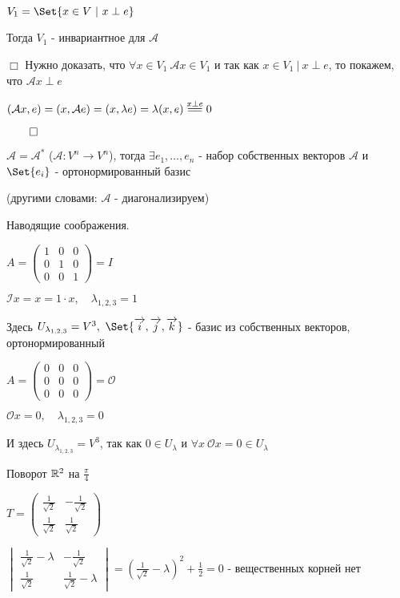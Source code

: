\documentclass[12pt]{article}
\begin{document}
    $V_1 = \Set{x \in V \ | \ x \perp e}$

    Тогда $V_1$ - инвариантное для $\mathcal{A}$

    $\Box$ Нужно доказать, что $\forall x \in V_1 \ \mathcal{A}x \in V_1$ и так как $x \in V_1 \ | \ x \perp e$, то
    покажем, что $\mathcal{A}x \perp e$

    $(\mathcal{A}x, e) = (x, \mathcal{A}e) = (x, \lambda e) = \lambda (x, e) \stackrel{x \perp e}{=\joinrel=} 0$

    $\qed$

    \hypertarget{theoremabouteigenvectorsinselfconjugateoperator}{}

    \Th $\mathcal{A} = \mathcal{A}^*$ ($\mathcal{A} : V^n \to V^n$),
    тогда $\exists e_1, \dots, e_n$ - набор собственных векторов $\mathcal{A}$ и $\Set{e_i}$ - ортонормированный базис

    (другими словами: $\mathcal{A}$ - диагонализируем)

    Наводящие соображения.

     $A = \begin{pmatrix}1 & 0 & 0 \\ 0 & 1 & 0 \\ 0 & 0 & 1\end{pmatrix} = I$

    $\mathcal{I}x = x = 1 \cdot x, \quad \lambda_{1,2,3} = 1$

    Здесь $U_{\lambda_{1,2,3}} = V^3, \ \Set{\overrightarrow{i}, \overrightarrow{j}, \overrightarrow{k}}$ - базис из собственных векторов, ортонормированный

     $A = \begin{pmatrix}0 & 0 & 0 \\ 0 & 0 & 0 \\ 0 & 0 & 0\end{pmatrix} = \mathcal{O}$

    $\mathcal{O}x = 0, \quad \lambda_{1,2,3} = 0$

    И здесь $U_{\lambda_{1,2,3}} = V^3$, так как $0 \in U_\lambda$ и $\forall x \ \mathcal{O}x = 0 \in U_\lambda$

     Поворот $\mathbb{R}^2$ на $\frac{\pi}{4}$

    $T = \begin{pmatrix}\frac{1}{\sqrt{2}} & -\frac{1}{\sqrt{2}} \\ \frac{1}{\sqrt{2}} & \frac{1}{\sqrt{2}}\end{pmatrix}$

    $\begin{vmatrix}\frac{1}{\sqrt{2}} - \lambda & -\frac{1}{\sqrt{2}} \\ \frac{1}{\sqrt{2}} & \frac{1}{\sqrt{2}} - \lambda\end{vmatrix} =
    \left(\frac{1}{\sqrt{2}} - \lambda\right)^2 + \frac{1}{2} = 0$ - вещественных корней нет
\end{document}
